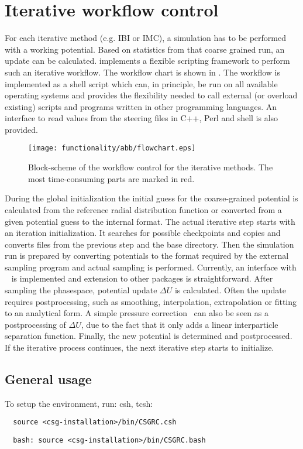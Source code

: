 \section{Iterative workflow control}
\label{sec:impl:scripting}
For each iterative method (e.g. IBI or IMC), a simulation has to be performed with a working potential. Based on statistics from that coarse grained run, an update can be calculated. \votca implements a flexible scripting framework to perform such an iterative workflow. The workflow chart is shown in . The workflow is implemented as a shell script which can, in principle, be run on all available operating systems and provides the flexibility needed to call external (or overload existing) scripts and programs written in other programming languages. An interface to read values from the steering \xml files in C++, Perl and shell is also provided.

\begin{figure}
  \texttt{[image: functionality/abb/flowchart.eps]}
  \caption{
    \label{fig:flowchart}
    Block-scheme of the workflow control for the iterative methods. The most time-consuming parts are marked in red.
  }
\end{figure}

During the global initialization the initial guess for the coarse-grained potential is calculated from the reference radial distribution function or converted from a given potential guess to the internal format. The actual iterative step starts with an iteration initialization. It searches for possible checkpoints and copies and converts files from the previous step and the base directory. Then the simulation run is prepared by converting potentials to the format required by the external sampling program and actual sampling is performed. Currently, an interface with \gromacs~\cite{gromacs4} is implemented and extension to other packages is straightforward. After sampling the phasespace, potential update $\Delta U$ is calculated. Often the update requires postprocessing, such as smoothing, interpolation, extrapolation or fitting to an analytical form. A simple pressure correction~\cite{Reith:2003} can also be seen as a postprocessing of $\Delta U$, due to the fact that it only adds a linear interparticle separation function.
%
Finally, the new potential is determined and postprocessed. If the iterative process continues, the next iterative step starts to initialize.

\subsection{General usage}
To setup the environment, run:
csh, tcsh:
\begin{verbatim}
  source <csg-installation>/bin/CSGRC.csh
\end{verbatim}
\begin{verbatim}
  bash: source <csg-installation>/bin/CSGRC.bash
\end{verbatim}


